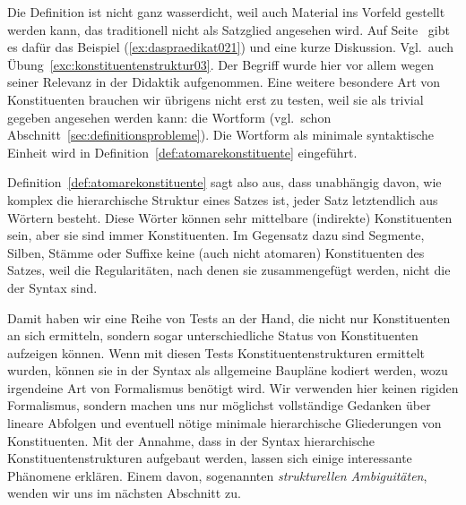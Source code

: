 
Die Definition ist nicht ganz wasserdicht, weil auch Material ins Vorfeld gestellt werden kann, das traditionell nicht als Satzglied angesehen wird.
Auf Seite~\pageref{abs:daspraedikat020} gibt es dafür das Beispiel (\ref{ex:daspraedikat021}) und eine kurze Diskussion.
Vgl.\ auch Übung~\ref{exc:konstituentenstruktur03}.
Der Begriff wurde hier vor allem wegen seiner Relevanz in der Didaktik aufgenommen.
Eine weitere besondere Art von Konstituenten brauchen wir übrigens nicht erst zu testen, weil sie als trivial gegeben angesehen werden kann: die Wortform (vgl.\ schon Abschnitt~\ref{sec:definitionsprobleme}).
Die Wortform als minimale syntaktische Einheit wird in Definition~\ref{def:atomarekonstituente} eingeführt.



Definition~\ref{def:atomarekonstituente} sagt also aus, dass unabhängig davon, wie komplex die hierarchische Struktur eines Satzes ist, jeder Satz letztendlich aus Wörtern besteht.
Diese Wörter können sehr mittelbare (indirekte) Konstituenten sein, aber sie sind immer Konstituenten.
Im Gegensatz dazu sind Segmente, Silben, Stämme oder Suffixe keine (auch nicht atomaren) Konstituenten des Satzes, weil die Regularitäten, nach denen sie zusammengefügt werden, nicht die der Syntax sind.

Damit haben wir eine Reihe von Tests an der Hand, die nicht nur Konstituenten an sich ermitteln, sondern sogar unterschiedliche Status von Konstituenten aufzeigen können.
Wenn mit diesen Tests Konstituentenstrukturen ermittelt wurden, können sie in der Syntax als allgemeine Baupläne kodiert werden, wozu irgendeine Art von Formalismus benötigt wird.
Wir verwenden hier keinen rigiden Formalismus, sondern machen uns nur möglichst vollständige Gedanken über lineare Abfolgen und eventuell nötige minimale hierarchische Gliederungen von Konstituenten.
Mit der Annahme, dass in der Syntax hierarchische Konstituentenstrukturen aufgebaut werden, lassen sich einige interessante Phänomene erklären.
Einem davon, sogenannten \textit{strukturellen Ambiguitäten}, wenden wir uns im nächsten Abschnitt zu.

